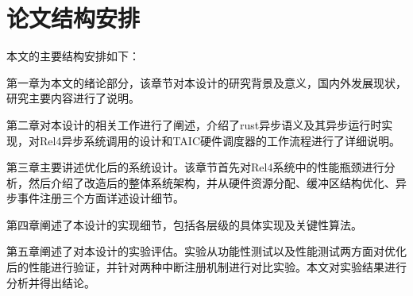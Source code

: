 \section{论文结构安排}

本文的主要结构安排如下：

第一章为本文的绪论部分，该章节对本设计的研究背景及意义，国内外发展现状，研究主要内容进行了说明。

第二章对本设计的相关工作进行了阐述，介绍了rust异步语义及其异步运行时实现，对Rel4异步系统调用的设计和TAIC硬件调度器的工作流程进行了详细说明。

第三章主要讲述优化后的系统设计。该章节首先对Rel4系统中的性能瓶颈进行分析，然后介绍了改造后的整体系统架构，并从硬件资源分配、缓冲区结构优化、异步事件注册三个方面详述设计细节。

第四章阐述了本设计的实现细节，包括各层级的具体实现及关键性算法。

第五章阐述了对本设计的实验评估。实验从功能性测试以及性能测试两方面对优化后的性能进行验证，并针对两种中断注册机制进行对比实验。本文对实验结果进行分析并得出结论。

